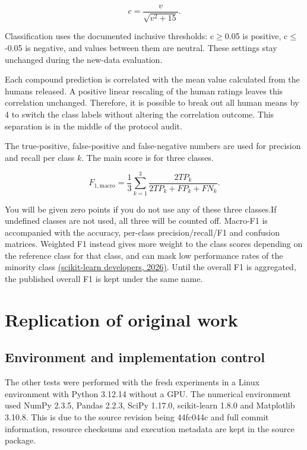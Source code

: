 \documentclass[11pt]{article}
\begin{document}
\begin{equation}c=\frac{v}{\sqrt{v^2+15}}.\end{equation}

Classification uses the documented inclusive thresholds: c\ensuremath{\geq}0.05 is positive, c\ensuremath{\leq}-0.05 is negative, and values between them are neutral. These settings stay unchanged during the new-data evaluation.


Each compound prediction is correlated with the mean value calculated from the humans released. A positive linear rescaling of the human ratings leaves this correlation unchanged. Therefore, it is possible to break out all human means by 4 to switch the class labels without altering the correlation outcome. This separation is in the middle of the protocol audit.


The true-positive, false-positive and false-negative numbers are used for precision and recall per class $k$. The main score is for three classes.


\begin{equation}F_{1,\mathrm{macro}}=\frac{1}{3}\sum_{k=1}^{3}\frac{2TP_k}{2TP_k+FP_k+FN_k}.\end{equation}

You will be given zero points if you do not use any of these three classes.If undefined classes are not used, all three will be counted off. Macro-F1 is accompanied with the accuracy, per-class precision/recall/F1 and confusion matrices. Weighted F1 instead gives more weight to the class scores depending on the reference class for that class, and can mask low performance rates of the minority class \hyperlink{ref_sklearnMetrics}{(scikit-learn developers, 2026)}. Until the overall F1 is aggregated, the published overall F1 is kept under the same name.


\section{Replication of original work}

\subsection{Environment and implementation control}

The other tests were performed with the fresh experiments in a Linux environment with Python 3.12.14 without a GPU. The numerical environment used NumPy 2.3.5, Pandas 2.2.3, SciPy 1.17.0, scikit-learn 1.8.0 and Matplotlib 3.10.8. This is due to the source revision being 44fc044c and full commit information, resource checksums and execution metadata are kept in the source package.
\end{document}

